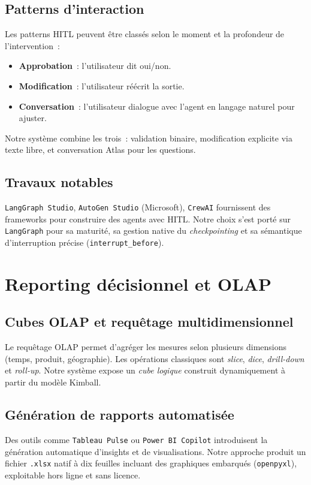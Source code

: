 \documentclass[12pt, a4paper]{report}
\begin{document}
\subsection{Patterns d'interaction}
Les patterns \ac{HITL} peuvent être classés selon le moment et la
profondeur de l'intervention~:
\begin{itemize}
  \item \textbf{Approbation}~: l'utilisateur dit oui/non.
  \item \textbf{Modification}~: l'utilisateur réécrit la sortie.
  \item \textbf{Conversation}~: l'utilisateur dialogue avec l'agent
        en langage naturel pour ajuster.
\end{itemize}
Notre système combine les trois~: validation binaire, modification
explicite via texte libre, et conversation Atlas pour les questions.

\subsection{Travaux notables}
\texttt{LangGraph Studio}, \texttt{AutoGen Studio} (Microsoft),
\texttt{CrewAI} fournissent des frameworks pour construire des
agents avec \ac{HITL}. Notre choix s'est porté sur \texttt{LangGraph}
pour sa maturité, sa gestion native du \emph{checkpointing} et sa
sémantique d'interruption précise (\texttt{interrupt\_before}).

\section{Reporting décisionnel et OLAP}

\subsection{Cubes OLAP et requêtage multidimensionnel}
Le requêtage \ac{OLAP} permet d'agréger les mesures selon plusieurs
dimensions (temps, produit, géographie). Les opérations classiques
sont \emph{slice}, \emph{dice}, \emph{drill-down} et \emph{roll-up}.
Notre système expose un \emph{cube logique} construit dynamiquement
à partir du modèle Kimball.

\subsection{Génération de rapports automatisée}
Des outils comme \texttt{Tableau Pulse} ou \texttt{Power BI Copilot}
introduisent la génération automatique d'insights et de visualisations.
Notre approche produit un fichier \texttt{.xlsx} natif à dix feuilles
incluant des graphiques embarqués (\texttt{openpyxl}), exploitable hors
ligne et sans licence.
\end{document}
